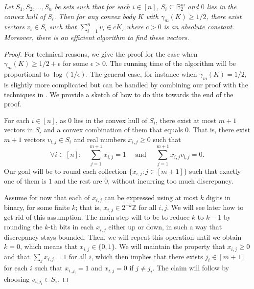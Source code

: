 \documentclass{toc}
\begin{document}
 \emph{Let $S_1,S_2,\dots,S_n$  be sets such that for each $i\in [n]$, $S_i \subseteq \mathbb{B}_2^m$ and $0$ lies in the convex hull of $S_i$. Then for any convex body $K$ with $\gamma_m(K)\ge 1/2$, there exist vectors $v_i\in S_i$ such that
$\sum_{i=1}^n v_i \in cK$,
where $c>0$ is an absolute constant. Moreover, there is an efficient algorithm to find these vectors.
}
\begin{proof}
For technical reasons, we give the proof for the case when $\gamma_m(K)\ge 1/2+\epsilon$ for some $\epsilon>0$. The running time of the algorithm will be proportional to $\log(1/\epsilon)$. The general case, for instance when $\gamma_m(K)=1/2$, is slightly more complicated but can be handled by combining our proof with the techniques in \cite{DGLN16}. We provide a sketch of how to do this towards the end of the proof.

For each $i\in [n]$, as $0$ lies in the convex hull of $S_i$, there exist at most $m+1$ vectors in $S_i$ and a convex combination of them that equals $0$.
That is, there exist $m+1$ vectors $v_{i,j}\in S_i$ and real numbers $x_{i,j}\ge0$ such that
\begin{equation}
\label{eqn:genbana2}
\forall i \in [n]: \quad \sum_{j=1}^{m+1} x_{i,j}=1 \quad\text{ and }\quad\sum_{j=1}^{m+1} x_{i,j}v_{i,j}=0.
\end{equation}
Our goal will be to round each collection $\{x_{i,j}: j \in [m+1]\}$ such that exactly one of them is $1$ and the rest are $0$, without incurring too much discrepancy.

Assume for now that each of $x_{i,j}$ can be expressed using at most $k$ digits in binary, for some finite $k$; that is, $x_{i,j} \in 2^{-k}\mathbb{Z}$ for all $i,j$.
We will see later how to get rid of this assumption. The main step will to be to reduce $k$ to $k-1$ by rounding the $k$-th bits in each $x_{i,j}$ either up or down,
in such a way that discrepancy stays bounded. Then, we will repeat this operation until we obtain $k=0$, which means that $x_{i,j} \in \{0,1\}$.
We will maintain the property that $x_{i,j} \ge 0$ and that $\sum_j x_{i,j}=1$ for all $i$, which then implies that there exists $j_{i} \in [m+1]$ for each $i$ such that $x_{i,j_i}=1$
and $x_{i,j}=0$ if $j \ne j_i$. The claim will follow by choosing $v_{i,j_i} \in S_i$.



\end{proof}
\end{document}
